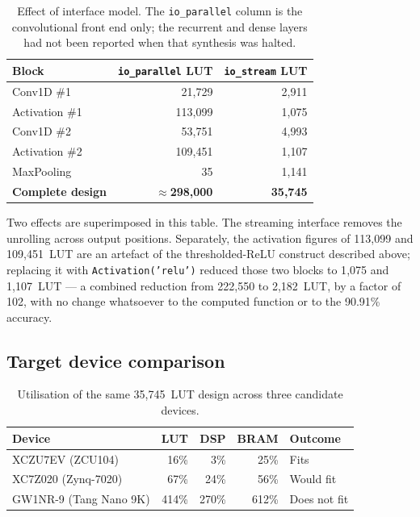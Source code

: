 \documentclass[11pt,a4paper]{article}
\begin{document}
\begin{table}[h]
\centering
\begin{tabular}{lrr}
\toprule
\textbf{Block} & \textbf{\texttt{io\_parallel} LUT} & \textbf{\texttt{io\_stream} LUT} \\
\midrule
Conv1D \#1     & 21{,}729  & 2{,}911 \\
Activation \#1 & 113{,}099 & 1{,}075 \\
Conv1D \#2     & 53{,}751  & 4{,}993 \\
Activation \#2 & 109{,}451 & 1{,}107 \\
MaxPooling     & 35        & 1{,}141 \\
\midrule
\textbf{Complete design} & $\approx$\textbf{298{,}000} & \textbf{35{,}745} \\
\bottomrule
\end{tabular}
\caption{Effect of interface model. The \texttt{io\_parallel} column is the
convolutional front end only; the recurrent and dense layers had not been
reported when that synthesis was halted.}
\label{tab:relu}
\end{table}

Two effects are superimposed in this table. The streaming interface removes the
unrolling across output positions. Separately, the activation figures of
113{,}099 and 109{,}451~LUT are an artefact of the thresholded-ReLU construct
described above; replacing it with \texttt{Activation('relu')} reduced those two
blocks to 1{,}075 and 1{,}107~LUT --- a combined reduction from 222{,}550 to
2{,}182~LUT, by a factor of 102, with no change whatsoever to the computed
function or to the 90.91\% accuracy.

\subsection{Target device comparison}

\begin{table}[h]
\centering
\begin{tabular}{lrrrl}
\toprule
\textbf{Device} & \textbf{LUT} & \textbf{DSP} & \textbf{BRAM} & \textbf{Outcome} \\
\midrule
XCZU7EV (ZCU104)   & 16\%  & 3\%   & 25\%  & Fits \\
XC7Z020 (Zynq-7020)& 67\%  & 24\%  & 56\%  & Would fit \\
GW1NR-9 (Tang Nano 9K) & 414\% & 270\% & 612\% & Does not fit \\
\bottomrule
\end{tabular}
\caption{Utilisation of the same 35{,}745~LUT design across three candidate
devices.}
\end{table}
\end{document}
